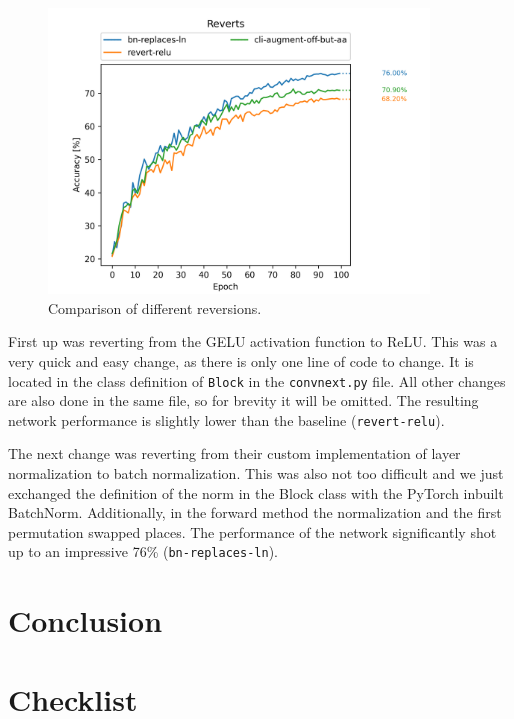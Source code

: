 \documentclass{article}
\begin{document}
\begin{figure}[h]
    \centering
    \includegraphics[width=0.9\textwidth]{images/reverts}
    \caption{Comparison of different reversions.}
    \label{fig:reverts}
\end{figure}

First up was reverting from the GELU activation function to ReLU\@.
This was a very quick and easy change, as there is only one line of code to change.
It is located in the class definition of \texttt{Block} in the \texttt{convnext.py} file.
All other changes are also done in the same file, so for brevity it will be omitted.
The resulting network performance is slightly lower than the baseline (\texttt{revert-relu}).

The next change was reverting from their custom implementation of layer normalization to batch normalization.
This was also not too difficult and we just exchanged the definition of the norm in the Block class with the PyTorch inbuilt BatchNorm.
Additionally, in the forward method the normalization and the first permutation swapped places.
The performance of the network significantly shot up to an impressive 76\% (\texttt{bn-replaces-ln}).



\section{Conclusion}\label{sec:conclusion}

\printbibliography
\section*{Checklist}

\end{document}
